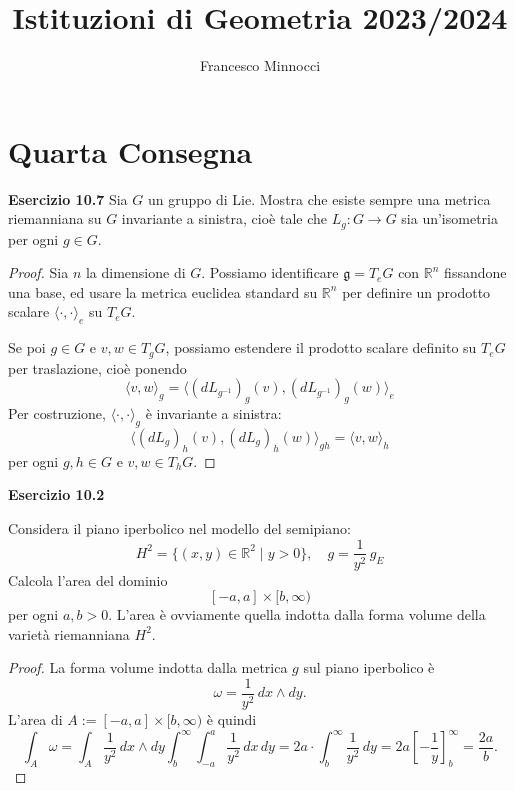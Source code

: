 \documentclass[a4paper]{article}
\title{Istituzioni di Geometria 2023/2024}
\author{Francesco Minnocci}
\newcommand{\R}{\mathbb{R}}
\theoremstyle{definition}
\theoremstyle{definition}
\theoremstyle{remark}
\theoremstyle{definition}
\begin{document}
\maketitle
\section*{Quarta Consegna}
\textbf{Esercizio 10.7}
Sia $G$ un gruppo di Lie. Mostra che esiste sempre una metrica riemanniana su $G$ invariante a sinistra, cioè tale che $L_g : G \to G$ sia un'isometria per ogni $g \in G$.
\begin{proof}
Sia $n$ la dimensione di $G$. Possiamo identificare $\mathfrak{g}=T_eG$ con $\R^n$ fissandone una base, ed usare la metrica euclidea standard su $\R^n$ per
definire un prodotto scalare $\langle \cdot, \cdot \rangle_e$ su $T_eG$.

Se poi $g \in G$ e $v, w \in T_gG$, possiamo estendere il prodotto scalare definito su $T_eG$ per traslazione, cioè ponendo
\[
\langle v, w \rangle_g = \langle (dL_{g^{-1}})_g(v), (dL_{g^{-1}})_g(w) \rangle_e
\]
Per costruzione, $\langle \cdot, \cdot \rangle_g$ è invariante a sinistra:
\[
\langle (dL_g)_h(v), (dL_g)_h(w) \rangle_{gh} = \langle v, w \rangle_h
\]
per ogni $g, h \in G$ e $v, w \in T_hG$.

\end{proof}

\textbf{Esercizio 10.2}

Considera il piano iperbolico nel modello del semipiano:
\[
H^2 = \{(x, y) \in \R^2 \mid y > 0\}, \quad g = \frac{1}{y^2} \, g_E
\]
Calcola l'area del dominio
\[
[-a, a] \times [b, \infty)
\] per ogni $a, b > 0$. L'area è ovviamente quella indotta dalla forma volume della varietà riemanniana $H^2$.
\begin{proof}
La forma volume indotta dalla metrica $g$ sul piano iperbolico è
\[
    \omega = \frac{1}{y^2} \, dx \wedge dy
.\]
L'area di $A:=[-a, a] \times [b, \infty)$ è quindi
\[
    \int_A \omega = \int_A \frac{1}{y^2} \, dx \wedge dy
    \int_{b}^{\infty} \int_{-a}^{a} \frac{1}{y^2} \, dx \, dy = 2a\cdot \int_{b}^{\infty} \frac{1}{y^2} \, dy = 2a \left[ -\frac{1}{y} \right]_{b}^{\infty} = \frac{2a}{b}
.\]
\end{proof}
\end{document}
